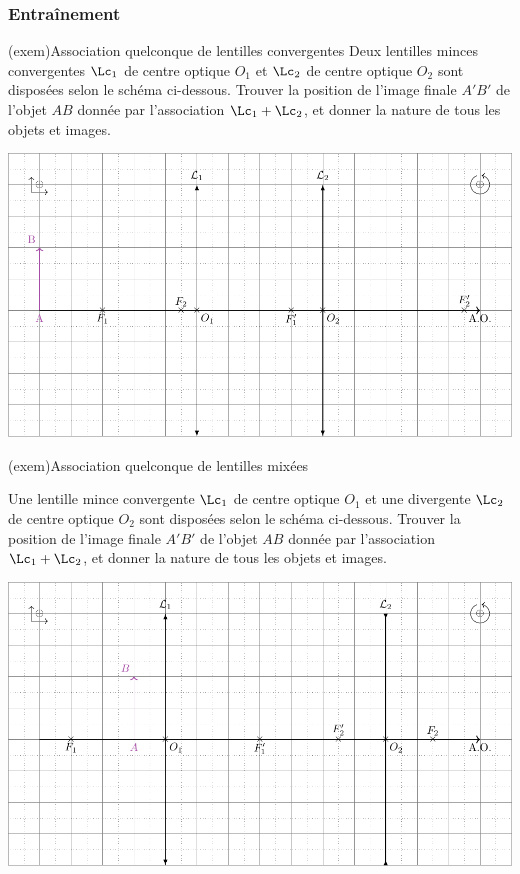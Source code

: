 \documentclass[../../main/main.tex]{subfiles}
\begin{document}
\subsubsection{Entraînement}

\begin{tcb}[label=exem:asso_lent](exem){Association quelconque de lentilles
			convergentes}
	Deux lentilles minces convergentes $\Lc_1$ de centre optique $O_1$ et
	$\Lc_2$ de centre optique $O_2$ sont disposées selon le schéma ci-dessous.
	Trouver la position de l'image finale $A'B'$ de l'objet $AB$ donnée par
	l'association $\Lc_1 + \Lc_2$, et donner la nature de tous les objets et
	images.
	\tcblower
	\begin{center}
		\includegraphics[width=.85\linewidth]{asso_lent-a_plain.pdf}
		\label{fig:asso_lent-conv_plain}
	\end{center}
\end{tcb}
\begin{tcb}[label=exem:asso_lent](exem){Association quelconque de lentilles
			mixées}

	Une lentille mince convergente $\Lc_1$ de centre optique $O_1$ et une
	divergente $\Lc_2$ de centre optique $O_2$ sont disposées selon le schéma
	ci-dessous. Trouver la position de l'image finale $A'B'$ de l'objet $AB$
	donnée par l'association $\Lc_1 + \Lc_2$, et donner la nature de tous les
	objets et images.

	\tcblower
	\begin{center}
		\includegraphics[width=.85\linewidth]{asso_lent-b_plain.pdf}
		\label{fig:asso_lent-mix_plain}
	\end{center}
\end{tcb}
\end{document}
